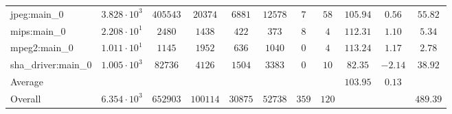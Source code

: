\begin{tabular}{|l|c|c|c|c|c|c|c|c|c|c|}
jpeg:main\_0            & $ 3.828 \cdot 10^{3}  $ & $ 405543 $ & $ 20374  $ & $ 6881  $ & $ 12578 $ & $ 7   $ & $ 58  $ & $ 105.94      $ & $ 0.56    $ & $ 55.82   $ \\
mips:main\_0            & $ 2.208 \cdot 10^{1}  $ & $ 2480   $ & $ 1438   $ & $ 422   $ & $ 373   $ & $ 8   $ & $ 4   $ & $ 112.31      $ & $ 1.10    $ & $ 5.34    $ \\
mpeg2:main\_0           & $ 1.011 \cdot 10^{1}  $ & $ 1145   $ & $ 1952   $ & $ 636   $ & $ 1040  $ & $ 0   $ & $ 4   $ & $ 113.24      $ & $ 1.17    $ & $ 2.78    $ \\
sha\_driver:main\_0     & $ 1.005 \cdot 10^{3}  $ & $ 82736  $ & $ 4126   $ & $ 1504  $ & $ 3383  $ & $ 0   $ & $ 10  $ & $ 82.35       $ & $ -2.14   $ & $ 38.92   $ \\
\hline
Average                 & $                     $ & $        $ & $        $ & $       $ & $       $ & $     $ & $     $ & $ 103.95      $ & $ 0.13    $ & $         $ \\
\hline
Overall                 & $ 6.354 \cdot 10^{3}  $ & $ 652903 $ & $ 100114 $ & $ 30875 $ & $ 52738 $ & $ 359 $ & $ 120 $ & $             $ & $         $ & $ 489.39  $ \\
\hline
\end{tabular}
